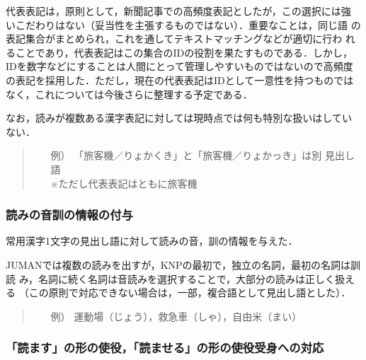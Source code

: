 \documentclass[a4j,titlepage]{jarticle}
\begin{document}
代表表記は，原則として，新聞記事での高頻度表記としたが，この選択には強
いこだわりはない（妥当性を主張するものではない）．重要なことは，同じ語
の表記集合がまとめられ，これを通してテキストマッチングなどが適切に行わ
れることであり，代表表記はこの集合のIDの役割を果たすものである．しかし，
IDを数字などにすることは人間にとって管理しやすいものではないので高頻度
の表記を採用した．ただし，現在の代表表記はIDとして一意性を持つものでは
なく，これについては今後さらに整理する予定である．

なお，読みが複数ある漢字表記に対しては現時点では何も特別な扱いはしてい
ない．
       \begin{quote}
	\begin{itemize} 
	 \item[例）] 「旅客機／りょかくき」と「旅客機／りょかっき」は別
		   見出し語 \\
		   ※ただし代表表記はともに旅客機
	\end{itemize}
       \end{quote}


\subsubsection{読みの音訓の情報の付与}

常用漢字1文字の見出し語に対して読みの音，訓の情報を与えた．

JUMANでは複数の読みを出すが，KNPの最初で，独立の名詞，最初の名詞は訓読
み，名詞に続く名詞は音読みを選択することで，大部分の読みは正しく扱える
（この原則で対応できない場合は，一部，複合語として見出し語とした）．

      \begin{quote}
	\begin{itemize} 
	 \item[例）] 運動場（じょう），救急車（しゃ），自由米（まい）
	\end{itemize}
      \end{quote}

\subsubsection{「読ます」の形の使役，「読ませる」の形の使役受身への対応}
\end{document}
